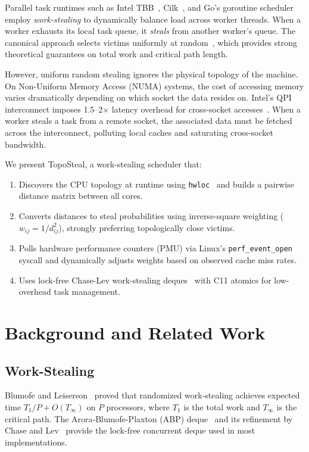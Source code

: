 \documentclass[conference]{IEEEtran}
\begin{document}
Parallel task runtimes such as Intel TBB~\cite{tbb}, Cilk~\cite{cilk5}, and Go's goroutine scheduler employ \emph{work-stealing} to dynamically balance load across worker threads. When a worker exhausts its local task queue, it \emph{steals} from another worker's queue. The canonical approach selects victims uniformly at random~\cite{blumofe1999}, which provides strong theoretical guarantees on total work and critical path length.

However, uniform random stealing ignores the physical topology of the machine. On Non-Uniform Memory Access (NUMA) systems, the cost of accessing memory varies dramatically depending on which socket the data resides on. Intel's QPI interconnect imposes 1.5--2$\times$ latency overhead for cross-socket accesses~\cite{lameter2013}. When a worker steals a task from a remote socket, the associated data must be fetched across the interconnect, polluting local caches and saturating cross-socket bandwidth.

We present TopoSteal, a work-stealing scheduler that:
\begin{enumerate}
    \item Discovers the CPU topology at runtime using \texttt{hwloc}~\cite{hwloc} and builds a pairwise distance matrix between all cores.
    \item Converts distances to steal probabilities using inverse-square weighting ($w_{ij} = 1/d_{ij}^2$), strongly preferring topologically close victims.
    \item Polls hardware performance counters (PMU) via Linux's \texttt{perf\_event\_open} syscall and dynamically adjusts weights based on observed cache miss rates.
    \item Uses lock-free Chase-Lev work-stealing deques~\cite{chaselev} with C11 atomics for low-overhead task management.
\end{enumerate}

\section{Background and Related Work}

\subsection{Work-Stealing}

Blumofe and Leiserson~\cite{blumofe1999} proved that randomized work-stealing achieves expected time $T_1/P + O(T_\infty)$ on $P$ processors, where $T_1$ is the total work and $T_\infty$ is the critical path. The Arora-Blumofe-Plaxton (ABP) deque~\cite{abp1998} and its refinement by Chase and Lev~\cite{chaselev} provide the lock-free concurrent deque used in most implementations.
\end{document}
